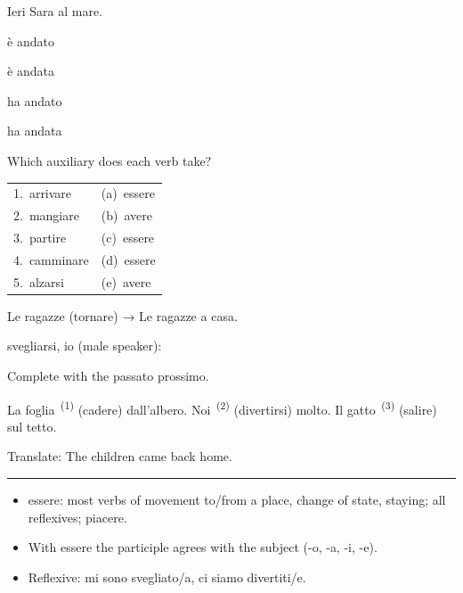 \documentclass[11pt,a4paper,twoside,openright]{book}
\newcommand{\blank}{\underline{\hspace{2.6cm}}}
\newcommand{\clozeblank}[1]{\underline{\hspace{2.4cm}}\textsuperscript{\,(#1)}}
\newcommand{\answerline}{\par\vspace{6pt}\noindent\rule{0.75\linewidth}{0.4pt}\par}
\begin{document}
\begin{exercises}
\item\label{ex:passato-prossimo-essere-1}\relax Ieri Sara \blank{} al mare.\par\nopagebreak\begin{options}
\item\relax è andato
\item\relax è andata
\item\relax ha andato
\item\relax ha andata
\end{options}
\item\label{ex:passato-prossimo-essere-2}\relax Which auxiliary does each verb take?\par\smallskip\begin{tabularx}{\linewidth}{@{}L L@{}}
1.\ arrivare & (a)\ essere \\
2.\ mangiare & (b)\ avere \\
3.\ partire & (c)\ essere \\
4.\ camminare & (d)\ essere \\
5.\ alzarsi & (e)\ avere \\
\end{tabularx}
\item\label{ex:passato-prossimo-essere-3}\relax Le ragazze (tornare) → Le ragazze \blank{} a casa.
\item\label{ex:passato-prossimo-essere-4}\relax svegliarsi, io (male speaker): \blank{}
\item\label{ex:passato-prossimo-essere-5}\relax Complete with the passato prossimo.\par\smallskip\begingroup\setlength{\parindent}{0pt}La foglia \clozeblank{1} (cadere) dall'albero. Noi \clozeblank{2} (divertirsi) molto. Il gatto \clozeblank{3} (salire) sul tetto.\par\endgroup
\item\label{ex:passato-prossimo-essere-6}\relax Translate: The children came back home.\par\answerline
\end{exercises}

\begin{summarybox}
\begin{itemize}
\item\relax essere: most verbs of movement to/from a place, change of state, staying; all reflexives; piacere.
\item\relax With essere the participle agrees with the subject (-o, -a, -i, -e).
\item\relax Reflexive: mi sono svegliato/a, ci siamo divertiti/e.
\end{itemize}
\end{summarybox}
\end{document}
